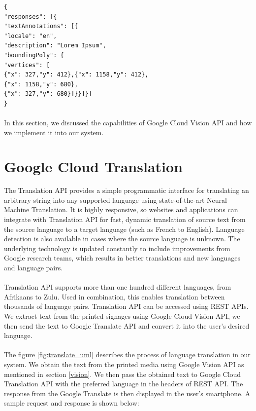 \documentclass[12pt]{article}
\begin{document}
\begin{lstlisting}
{
"responses": [{
"textAnnotations": [{
"locale": "en",
"description": "Lorem Ipsum",
"boundingPoly": {
"vertices": [
{"x": 327,"y": 412},{"x": 1158,"y": 412},
{"x": 1158,"y": 680},
{"x": 327,"y": 680}]}}]}]
}
\end{lstlisting}

\paragraph{} In this section, we discussed the capabilities of Google Cloud Vision API and how we implement it into our system. 

\section{Google Cloud Translation}
\label{translate}

\paragraph{}The Translation API provides a simple programmatic interface for translating an arbitrary string into any supported language using state-of-the-art Neural Machine Translation. It is highly responsive, so websites and applications can integrate with Translation API for fast, dynamic translation of source text from the source language to a target language (such as French to English). Language detection is also available in cases where the source language is unknown. The underlying technology is updated constantly to include improvements from Google research teams, which results in better translations and new languages and language pairs.

\paragraph{}Translation API supports more than one hundred different languages, from Afrikaans to Zulu. Used in combination, this enables translation between thousands of language pairs. Translation API can be accessed using REST APIs. We extract text from the printed signages using Google Cloud Vision API, we then send the text to Google Translate API and convert it into the user's desired language.

\paragraph{}The figure \ref{fig:translate_uml} describes the process of language translation in our system. We obtain the text from the printed media using Google Vision API as mentioned in section \ref{vision}. We then pass the obtained text to Google Cloud Translation API with the preferred language in the headers of REST API. The response from the Google Translate is then displayed in the user's smartphone. A sample request and response is shown below:
\end{document}
